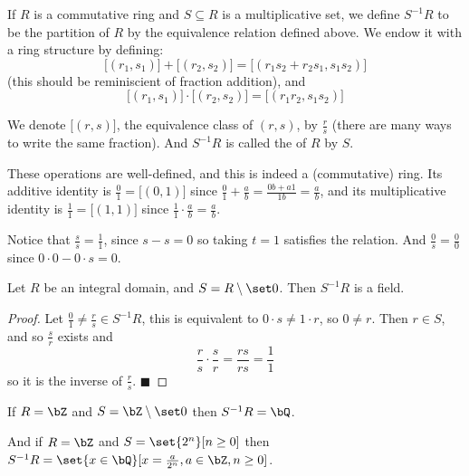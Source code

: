 \documentclass[10pt]{article}
\def\qed{\hskip1cm\hbox{}\hfill$\blacksquare$}
\begin{document}
\begin{defn*}

    If $R$ is a commutative ring and $S\subseteq R$ is a multiplicative set, we define $S^{-1}R$ to be the partition of $R$ by the equivalence relation defined above.
    We endow it with a ring structure by defining:
    \[ \bigl[(r_1,s_1)\bigr] + \bigl[(r_2,s_2)\bigr] = \bigl[(r_1s_2+r_2s_1, s_1s_2)\bigr] \]
    (this should be reminiscient of fraction addition), and
    \[ \bigl[(r_1,s_1)\bigr] \cdot \bigl[(r_2,s_2)\bigr] = \bigl[(r_1r_2, s_1s_2)\bigr] \]

    We denote $\bigl[(r,s)\bigr]$, the equivalence class of $(r,s)$, by $\frac rs$ (there are many ways to write the same fraction).
    And $S^{-1}R$ is called the  of $R$ by $S$.

\end{defn*}

These operations are well-defined, and this is indeed a (commutative) ring.
Its additive identity is $\frac01=\bigl[(0,1)\bigr]$ since $\frac01+\frac ab=\frac{0b+a1}{1b}=\frac ab$, and its multiplicative identity is $\frac11=\bigl[(1,1)\bigr]$ since
$\frac11\cdot\frac ab=\frac ab$.

Notice that $\frac ss=\frac11$, since $s-s=0$ so taking $t=1$ satisfies the relation.
And $\frac0s=\frac00$ since $0\cdot0-0\cdot s=0$.

\begin{prop*}

    Let $R$ be an integral domain, and $S=R\setminus\set0$.
    Then $S^{-1}R$ is a field.

\end{prop*}

\begin{proof}

    Let $\frac01\neq\frac rs\in S^{-1}R$, this is equivalent to $0\cdot s\neq 1\cdot r$, so $0\neq r$.
    Then $r\in S$, and so $\frac sr$ exists and
    \[ \frac rs\cdot\frac sr = \frac{rs}{rs} = \frac11 \]
    so it is the inverse of $\frac rs$.
    \qed

\end{proof}

\begin{exam*}

    \benum
        \item If $R=\bZ$ and $S=\bZ\setminus\set0$ then $S^{-1}R=\bQ$.
        \item And if $R=\bZ$ and $S=\set{2^n}[n\geq0]$ then $S^{-1}R=\set{x\in\bQ}[x=\frac a{2^n}, a\in\bZ, n\geq0]$.
    \eenum

\end{exam*}
\end{document}
